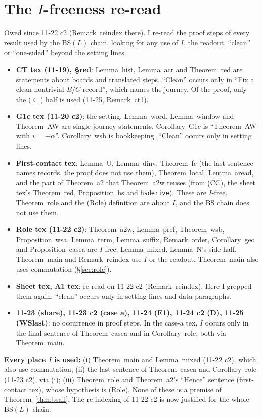 \documentclass[11pt]{article}
\theoremstyle{definition}\newtheorem{definition}[theorem]{Definition}\newtheorem{remark}[theorem]{Remark}
\begin{document}
\section{The $I$-freeness re-read}\label{sec:ifree}
Owed since 11-22 c2 (Remark~reindex there). I re-read the proof steps of every result used by the BS$(L)$ chain, looking for any use of $I$, the readout, ``clean'' or ``one-sided'' beyond the setting lines.
\begin{itemize}
\item \textbf{CT tex (11-19), \S red}: Lemma~hist, Lemma~acr and Theorem~red are statements about boards and translated steps. ``Clean'' occurs only in ``Fix a clean nontrivial $B/C$ record'', which names the journey. Of the proof, only the ($\subseteq$) half is used (11-25, Remark~ct1).
\item \textbf{G1c tex (11-20 c2)}: the setting, Lemma~word, Lemma~window and Theorem~AW are single-journey statements. Corollary~G1c is ``Theorem~AW with $v=-\alpha$''. Corollary~wsb is bookkeeping. ``Clean'' occurs only in setting lines.
\item \textbf{First-contact tex}: Lemma~U, Lemma~dinv, Theorem~fc (the last sentence names records, the proof does not use them), Theorem~local, Lemma~aread, and the part of Theorem~a2 that Theorem~a2w reuses (from (CC), the sheet tex's Theorem~red, Proposition~hs and \texttt{hsderive}). These are $I$-free. Theorem~role and the (Role) definition are about $I$, and the BS chain does not use them.
\item \textbf{Role tex (11-22 c2)}: Theorem~a2w, Lemma~pref, Theorem~wsb, Proposition~wsa, Lemma~term, Lemma~suffix, Remark~order, Corollary~geo and Proposition~casea are $I$-free. Lemma~mixed, Lemma~N's side half, Theorem~main and Remark~reindex use $I$ or the readout. Theorem~main also uses commutation (\S\ref{sec:role}).
\item \textbf{Sheet tex, A1 tex}: re-read on 11-22 c2 (Remark~reindex). Here I grepped them again: ``clean'' occurs only in setting lines and data paragraphs.
\item \textbf{11-23 (share), 11-23 c2 (case a), 11-24 (E1), 11-24 c2 (D), 11-25 (WSlast)}: no occurrence in proof steps. In the case-a tex, $I$ occurs only in the final sentence of Theorem~casea and in Corollary~role, both via Theorem~main.
\end{itemize}
\textbf{Every place $I$ is used:} (i) Theorem~main and Lemma~mixed (11-22 c2), which also use commutation; (ii) the last sentence of Theorem~casea and Corollary~role (11-23 c2), via (i); (iii) Theorem~role and Theorem~a2's ``Hence'' sentence (first-contact tex), whose hypothesis is (Role). None of these is a premise of Theorem~\ref{thm:bsall}. The re-indexing of 11-22 c2 is now justified for the whole BS$(L)$ chain.
\end{document}
